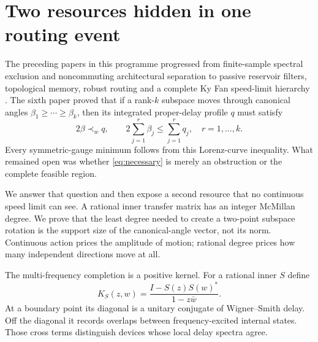 \documentclass[11pt]{article}
\theoremstyle{definition}
\theoremstyle{remark}
\begin{document}
\section{Two resources hidden in one routing event}

The preceding papers in this programme progressed from finite-sample
spectral exclusion and noncommuting architectural separation to passive
reservoir filters, topological memory, robust routing and a complete Ky Fan
speed-limit hierarchy
\cite{ErikssonFinite2026,ErikssonMIMO2026,ErikssonReservoir2026,
ErikssonMemory2026,ErikssonRouting2026,ErikssonKyFan2026}.
The sixth paper proved that if a rank-$k$ subspace moves through canonical
angles $\beta_1\geq\cdots\geq\beta_k$, then its integrated proper-delay
profile $q$ must satisfy
\begin{equation}\label{eq:necessary}
 2\beta\prec_w q,
 \qquad
 2\sum_{j=1}^r\beta_j\leq\sum_{j=1}^r q_j,
 \quad r=1,\ldots,k.
\end{equation}
Every symmetric-gauge minimum follows from this Lorenz-curve inequality.
What remained open was whether \eqref{eq:necessary} is merely an obstruction
or the complete feasible region.

We answer that question and then expose a second resource that no continuous
speed limit can see.  A rational inner transfer matrix has an integer
McMillan degree.  We prove that the least degree needed to create a two-point
subspace rotation is the support size of the canonical-angle vector, not its
norm.  Continuous action prices the amplitude of motion; rational degree
prices how many independent directions move at all.

The multi-frequency completion is a positive kernel.  For a rational inner
$S$ define
\begin{equation}\label{eq:kernelintro}
 K_S(z,w)=\frac{I-S(z)S(w)^*}{1-z\bar w}.
\end{equation}
At a boundary point its diagonal is a unitary conjugate of Wigner--Smith
delay.  Off the diagonal it records overlaps between frequency-excited
internal states.  Those cross terms distinguish devices whose local delay
spectra agree.
\end{document}
